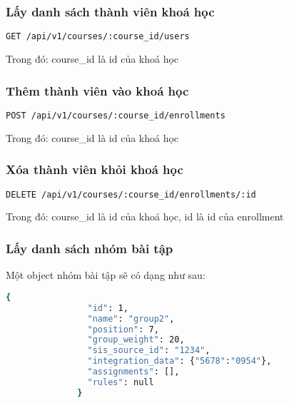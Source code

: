 \documentclass[../Thesis.tex]{subfiles}
\begin{document}
        \subsubsection{Lấy danh sách thành viên khoá học}
          \begin{lstlisting}[language=bash]
            GET /api/v1/courses/:course_id/users
          \end{lstlisting}

          Trong đó: course\_id là id của khoá học

        \subsubsection{Thêm thành viên vào khoá học}

          \begin{lstlisting}[language=bash]
            POST /api/v1/courses/:course_id/enrollments
          \end{lstlisting}

          Trong đó: course\_id là id của khoá học

        \subsubsection{Xóa thành viên khỏi khoá học}
          
            \begin{lstlisting}[language=bash]
              DELETE /api/v1/courses/:course_id/enrollments/:id
            \end{lstlisting}
  
            Trong đó: course\_id là id của khoá học, id là id của enrollment

          \subsubsection{Lấy danh sách nhóm bài tập}
            Một object nhóm bài tập sẽ có dạng như sau:

            \begin{lstlisting}[language=bash]
              {
                "id": 1,
                "name": "group2",
                "position": 7,
                "group_weight": 20,
                "sis_source_id": "1234",
                "integration_data": {"5678":"0954"},
                "assignments": [],
                "rules": null
              }
            \end{lstlisting}
\end{document}
